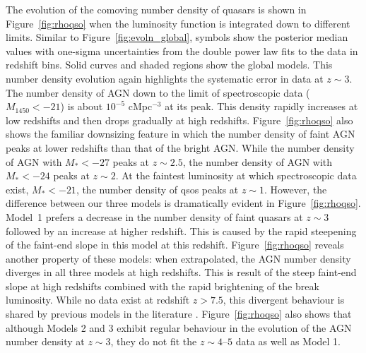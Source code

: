 \documentclass[fleqn,usenatbib]{mnras}
\begin{document}
The evolution of the comoving number density of quasars is shown in
Figure~\ref{fig:rhoqso} when the luminosity function is integrated
down to different limits.  Similar to Figure~\ref{fig:evoln_global},
symbols show the posterior median values with one-sigma uncertainties from the
double power law fits to the data in redshift bins.
Solid curves and
shaded regions show the global models.  This number density evolution
again highlights the systematic error in data at $z\sim 3$.  The
number density of AGN down to the limit of
spectroscopic data
($M_{1450}<-21$) is about $10^{-5}$ cMpc$^{-3}$ at its peak.  This
density rapidly increases
at low redshifts and then drops gradually at
high redshifts.  Figure~\ref{fig:rhoqso} also shows the familiar
downsizing feature in which the number density of faint AGN peaks at
lower redshifts than that of the bright AGN.  While the number density
of AGN with $M_*<-27$ peaks at $z\sim 2.5$, the number density of AGN
with $M_*<-24$ peaks at $z\sim 2$.  At the faintest luminosity at
which spectroscopic data exist, $M_*<-21$, the number density of qsos
peaks at $z\sim 1$.
However, the difference between our three models
is dramatically evident in Figure~\ref{fig:rhoqso}.  Model~1 prefers a
decrease in the number density of faint quasars at $z\sim 3$ followed
by an increase at higher redshift.  This is caused by the rapid
steepening of the faint-end slope in this model at this redshift.
Figure~\ref{fig:rhoqso} reveals another property of these models: when
extrapolated, the AGN number density diverges in all three models at
high redshifts.
This is result of the steep faint-end slope at high
redshifts combined with the rapid brightening of the break luminosity.
While no data exist at redshift $z>7.5$, this divergent behaviour is
shared by previous models in the literature
\citep{2007ApJ...654..731H}.  Figure~\ref{fig:rhoqso} also shows that
although Models 2 and 3 exhibit regular behaviour in the evolution of
the AGN number density at $z\sim 3$, they do not fit the $z\sim
4$--$5$ data as well as Model 1.
\end{document}
